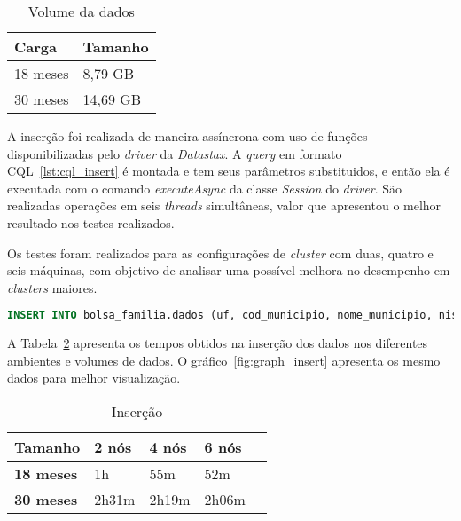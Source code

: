\begin{table}[]
	\centering
	\caption{Volume da dados}
	\label{tab:volume}
	\begin{tabular}{ll}
		\textbf{Carga} & \textbf{Tamanho} \\ \hline
		18 meses     &  8,79 GB              \\ \hline
		30 meses    &  14,69 GB             \\ \hline
	\end{tabular}
\end{table}

A inserção foi realizada de maneira assíncrona com uso de funções disponibilizadas pelo \emph{driver} da \emph{Datastax}. A \emph{query} em formato CQL~\ref{lst:cql_insert} é montada e tem seus parâmetros substituidos, e então ela é executada com o comando \emph{executeAsync} da classe \emph{Session} do \emph{driver}. São realizadas operações em seis \emph{threads} simultâneas, valor que apresentou o melhor resultado nos testes realizados.

Os testes foram realizados para as configurações de \emph{cluster} com duas, quatro e seis máquinas, com objetivo de analisar uma possível melhora no desempenho em \emph{clusters} maiores.

\begin{lstlisting}[caption={Código CQL para inserção},label={lst:cql_insert},language=SQL]
INSERT INTO bolsa_familia.dados (uf, cod_municipio, nome_municipio, nis_favorecido, nome_favorecido, fonte, valor, periodo) VALUES (?, ?, ?, ?, ?, ?, ?, ?)
\end{lstlisting}

A Tabela~\ref{tb_insert} apresenta os tempos obtidos na inserção dos dados nos diferentes ambientes e volumes de dados. O gráfico~\ref{fig:graph_insert} apresenta os mesmo dados para melhor visualização.


\begin{table}[]
	\centering
	\caption{Inserção}
	\label{tb_insert}
	\begin{tabular}{lllll}
		\textbf{Tamanho}	& \textbf{2 nós} & \textbf{4 nós} & \textbf{6 nós} \\ \hline
		\textbf{18 meses}   	& 1h         	 & 55m       	  & 52m            \\ \hline
		\textbf{30 meses}     & 2h31m      	 & 2h19m          & 2h06m          \\ \hline
	\end{tabular}
\end{table}

